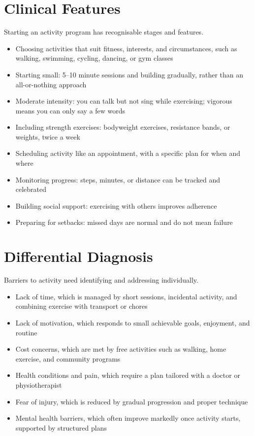 \section*{Clinical Features}
Starting an activity program has recognisable stages and features.
\begin{itemize}
    \item Choosing activities that suit fitness, interests, and circumstances, such as walking, swimming, cycling, dancing, or gym classes
    \item Starting small: 5--10 minute sessions and building gradually, rather than an all-or-nothing approach
    \item Moderate intensity: you can talk but not sing while exercising; vigorous means you can only say a few words
    \item Including strength exercises: bodyweight exercises, resistance bands, or weights, twice a week
    \item Scheduling activity like an appointment, with a specific plan for when and where
    \item Monitoring progress: steps, minutes, or distance can be tracked and celebrated
    \item Building social support: exercising with others improves adherence
    \item Preparing for setbacks: missed days are normal and do not mean failure
\end{itemize}

\section*{Differential Diagnosis}
Barriers to activity need identifying and addressing individually.
\begin{itemize}
    \item Lack of time, which is managed by short sessions, incidental activity, and combining exercise with transport or chores
    \item Lack of motivation, which responds to small achievable goals, enjoyment, and routine
    \item Cost concerns, which are met by free activities such as walking, home exercise, and community programs
    \item Health conditions and pain, which require a plan tailored with a doctor or physiotherapist
    \item Fear of injury, which is reduced by gradual progression and proper technique
    \item Mental health barriers, which often improve markedly once activity starts, supported by structured plans
\end{itemize}

